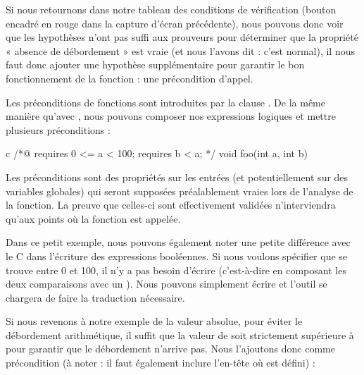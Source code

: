 Si nous retournons dans notre tableau des conditions de vérification (bouton
encadré en rouge dans la capture d'écran précédente), nous pouvons donc voir
que les hypothèses n'ont pas suffi aux prouveurs pour déterminer que la
propriété  « absence de débordement » est vraie (et nous l'avons dit : c'est
normal), il nous faut donc ajouter une hypothèse supplémentaire pour garantir
le bon fonctionnement de la fonction : une précondition d'appel.





Les préconditions de fonctions sont introduites par la clause .
De la même manière qu'avec , nous pouvons composer nos
expressions logiques et mettre plusieurs préconditions :



\begin{CodeBlock}{c}
/*@
  requires 0 <= a < 100;
  requires b < a;
*/
void foo(int a, int b){

}
\end{CodeBlock}



Les préconditions sont des propriétés sur les entrées (et potentiellement sur
des variables globales) qui seront supposées préalablement vraies lors de
l'analyse de la fonction. La preuve que celles-ci sont effectivement validées
n'interviendra qu'aux points où la fonction est appelée.



Dans ce petit exemple, nous pouvons également noter une petite différence avec
le C dans l'écriture des expressions booléennes. Si nous voulons spécifier
que  se trouve entre 0 et 100, il n'y a pas besoin d'écrire 
(c'est-à-dire en composant les deux comparaisons avec un \CodeInline{\&\&}). Nous
pouvons simplement écrire  et l'outil se chargera de faire
la traduction nécessaire.



Si nous revenons à notre exemple de la valeur absolue, pour éviter le
débordement arithmétique, il suffit que la valeur de  soit
strictement  supérieure à  pour garantir que le
débordement n'arrive pas.
Nous l'ajoutons donc comme précondition (à noter : il faut également
inclure l'en-tête où  est défini) :






